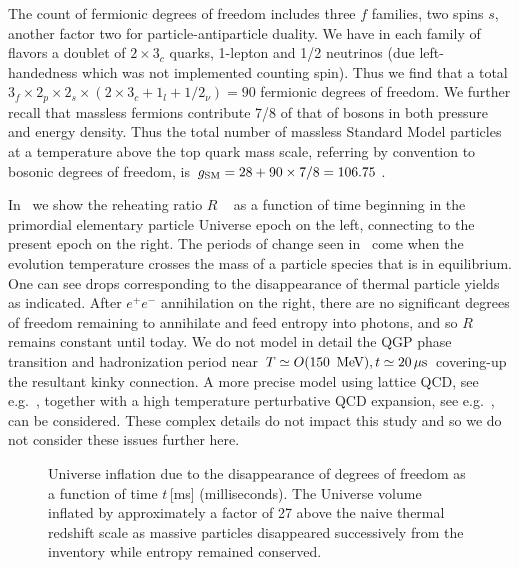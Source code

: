The count of fermionic degrees of freedom includes three $f$ families, two spins $s$, another factor two for particle-antiparticle duality. We have in each family of flavors a doublet of $2\times 3_c$ quarks, 1-lepton and 1/2 neutrinos (due left-handedness which was not implemented counting spin). Thus we find that a total $3_f\times 2_p\times 2_s\times(2\times 3_c+1_l+1/2_\nu)=90$ fermionic degrees of freedom. We further recall that massless fermions contribute 7/8 of that of bosons in both pressure and energy density. Thus the total number of massless Standard Model particles at a temperature above the top quark mass scale, referring by convention to bosonic degrees of freedom, is $g_{\rm SM}=28+90\times 7/8=106.75$\,.

In~ we show the reheating ratio $R$ ~ as a function of time beginning in the primordial elementary particle Universe epoch on the left, connecting to the present epoch on the right. The periods of change seen in~ come when the evolution temperature crosses the mass of a particle species that is in equilibrium. One can see drops corresponding to the disappearance of thermal particle yields as indicated. After $e^+e^-$ annihilation on the right, there are no significant degrees of freedom remaining to annihilate and feed entropy into photons, and so $R$ remains constant until today. We do not model in detail the QGP phase transition and hadronization period near $T\simeq O(150\,\text{ MeV}), t\simeq 20\,\mu\mathrm{s}$ covering-up the resultant kinky connection. A more precise model using lattice QCD, see e.g.~\cite{Borsanyi:2013bia}, together with a high temperature perturbative QCD expansion, see e.g.~\cite{Letessier:2002ony}, can be considered. These complex details do not impact this study and so we do not consider these issues further here.

\begin{figure}
\caption{Universe inflation due to the disappearance of degrees of freedom as a function of time $t$\,[ms] (milliseconds). The Universe volume inflated by approximately a factor of 27 above the naive thermal redshift scale as massive particles disappeared successively from the inventory while entropy remained conserved. }\label{fig:dof}
\end{figure}

